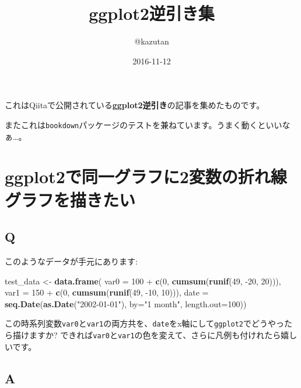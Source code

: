 \documentclass[]{book}
\title{ggplot2逆引き集}
\author{@kazutan}
\date{2016-11-12}
\newenvironment{Shaded}{\begin{snugshade}}{\end{snugshade}}
\newcommand{\KeywordTok}[1]{\textcolor[rgb]{0.13,0.29,0.53}{\textbf{{#1}}}}
\newcommand{\DataTypeTok}[1]{\textcolor[rgb]{0.13,0.29,0.53}{{#1}}}
\newcommand{\DecValTok}[1]{\textcolor[rgb]{0.00,0.00,0.81}{{#1}}}
\newcommand{\StringTok}[1]{\textcolor[rgb]{0.31,0.60,0.02}{{#1}}}
\newcommand{\NormalTok}[1]{{#1}}
\begin{document}
\maketitle

{
\setcounter{tocdepth}{1}
\tableofcontents
}
これはQiitaで公開されている\textbf{ggplot2逆引き}の記事を集めたものです。

またこれは\texttt{bookdown}パッケージのテストを兼ねています。うまく動くといいなぁ\ldots{}。

\chapter{ggplot2で同一グラフに2変数の折れ線グラフを描きたい}\label{ggplot22}

\section{Q}\label{q}

このようなデータが手元にあります:

\begin{Shaded}
\begin{Highlighting}[]
\NormalTok{test_data <-}\StringTok{ }\KeywordTok{data.frame}\NormalTok{(}
\DataTypeTok{var0 =} \DecValTok{100} \NormalTok{+}\StringTok{ }\KeywordTok{c}\NormalTok{(}\DecValTok{0}\NormalTok{, }\KeywordTok{cumsum}\NormalTok{(}\KeywordTok{runif}\NormalTok{(}\DecValTok{49}\NormalTok{, -}\DecValTok{20}\NormalTok{, }\DecValTok{20}\NormalTok{))),}
\DataTypeTok{var1 =} \DecValTok{150} \NormalTok{+}\StringTok{ }\KeywordTok{c}\NormalTok{(}\DecValTok{0}\NormalTok{, }\KeywordTok{cumsum}\NormalTok{(}\KeywordTok{runif}\NormalTok{(}\DecValTok{49}\NormalTok{, -}\DecValTok{10}\NormalTok{, }\DecValTok{10}\NormalTok{))),}
\DataTypeTok{date =} \KeywordTok{seq.Date}\NormalTok{(}\KeywordTok{as.Date}\NormalTok{(}\StringTok{"2002-01-01"}\NormalTok{), }\DataTypeTok{by=}\StringTok{"1 month"}\NormalTok{, }\DataTypeTok{length.out=}\DecValTok{100}\NormalTok{))}
\end{Highlighting}
\end{Shaded}

この時系列変数\texttt{var0}と\texttt{var1}の両方共を、\texttt{date}をx軸にして\texttt{ggplot2}でどうやったら描けますか?
できれば\texttt{var0}と\texttt{var1}の色を変えて、さらに凡例も付けれたら嬉しいです。

\section{A}\label{a}
\end{document}
